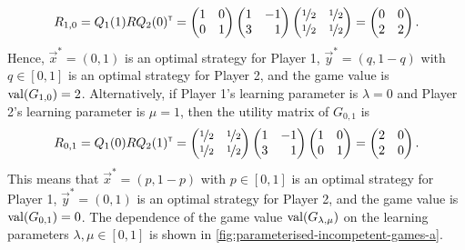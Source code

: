     \[
        R_{1, 0}
            = Q_1(1) R Q_2(0)^\transp
            =
            \begin{pmatrix}
                1 & 0 \\
                0 & 1 \\
            \end{pmatrix}
            \begin{pmatrix*}[r]
                1 & -1 \\
                3 & 1 \\
            \end{pmatrix*}
            \begin{pmatrix}
                \nicefrac{1}{2} & \nicefrac{1}{2} \\
                \nicefrac{1}{2} & \nicefrac{1}{2} \\
            \end{pmatrix}
            =
            \begin{pmatrix}
                0 & 0 \\
                2 & 2 \\
            \end{pmatrix}.
    \]
    Hence, $\vec{x}^* = (0, 1)$ is an optimal strategy for Player 1, $\vec{y}^* = (q, 1 - q)$ with $q \in [0, 1]$ is an optimal strategy for Player 2, and the game value is $\operatorname{val}(G_{1, 0}) = 2$.
    Alternatively, if Player 1's learning parameter is $\lambda = 0$ and Player 2's learning parameter is $\mu = 1$, then the utility matrix of $G_{0, 1}$ is
    \[
        R_{0, 1}
            = Q_1(0) R Q_2(1)^\transp
            =
            \begin{pmatrix}
                \nicefrac{1}{2} & \nicefrac{1}{2} \\
                \nicefrac{1}{2} & \nicefrac{1}{2} \\
            \end{pmatrix}
            \begin{pmatrix*}[r]
                1 & -1 \\
                3 & 1 \\
            \end{pmatrix*}
            \begin{pmatrix}
                 1 & 0 \\
                 0 & 1 \\
            \end{pmatrix}
            =
            \begin{pmatrix}
                2 & 0 \\
                2 & 0 \\
            \end{pmatrix}.
    \]
    This means that $\vec{x}^* = (p, 1 - p)$ with $p \in [0, 1]$ is an optimal strategy for Player 1, $\vec{y}^* = (0, 1)$ is an optimal strategy for Player 2, and the game value is $\operatorname{val}(G_{0, 1}) = 0$.
    The dependence of the game value $\operatorname{val}(G_{\lambda, \mu})$ on the learning parameters $\lambda, \mu \in [0, 1]$ is shown in \autoref{fig:parameterised-incompetent-games-a}.

